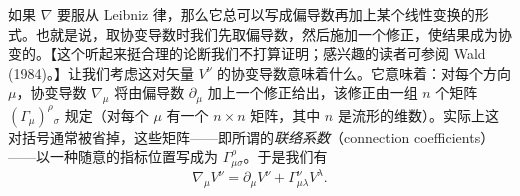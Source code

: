 如果 $\nabla$ 要服从 Leibniz 律，那么它总可以写成偏导数再加上某个线性变换的形式。也就是说，取协变导数时我们先取偏导数，然后施加一个修正，使结果成为协变的。【这个听起来挺合理的论断我们不打算证明；感兴趣的读者可参阅 Wald (1984)。】让我们考虑这对矢量 $V^\nu$ 的协变导数意味着什么。它意味着：对每个方向 $\mu$，协变导数 $\nabla_\mu$ 将由偏导数 $\partial_\mu$ 加上一个修正给出，该修正由一组 $n$ 个矩阵 $(\Gamma_\mu)^\rho{}_\sigma$ 规定（对每个 $\mu$ 有一个 $n\times n$ 矩阵，其中 $n$ 是流形的维数）。实际上这对括号通常被省掉，这些矩阵——即所谓的\emph{联络系数}（connection coefficients）——以一种随意的指标位置写成为 $\Gamma^\rho_{\mu\sigma}$。于是我们有
\begin{equation*}
\boxed{\;\nabla_\mu V^\nu = \partial_\mu V^\nu + \Gamma^\nu_{\mu\lambda} V^\lambda.\;}
\tag{3.5}
\end{equation*}


